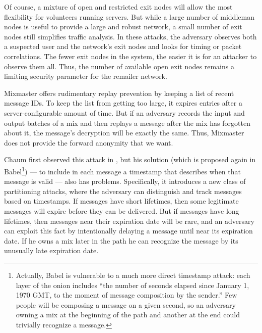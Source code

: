 \documentclass[times,10pt,twocolumn]{article}
\begin{document}

Of course, a mixture of open and restricted exit nodes will allow the
most flexibility for volunteers running servers. But while a large number
of middleman nodes is useful to provide a large and robust network, a
small number of exit nodes still simplifies traffic analysis.
In these attacks, the adversary observes both a suspected user and the
network's exit nodes and looks for timing or packet correlations.  The fewer
exit nodes in the system, the easier it is for an attacker to observe them
all.  Thus, the
number of available open exit nodes remains a limiting security parameter
for the remailer network.

\label{subsec:replay}

Mixmaster offers rudimentary replay prevention by keeping a list of recent
message IDs. To keep the list from getting too large, it expires entries
after a server-configurable amount of time. But if an adversary records
the input and output batches of a mix and then replays a message after
the mix has forgotten about it, the message's decryption will be exactly
the same. Thus, Mixmaster does not provide the forward anonymity that we want.

Chaum first observed this attack in \cite{chaum-mix},
but his solution (which is proposed again in Babel\footnote{
  Actually, Babel is vulnerable to a much more direct timestamp attack:
  each layer of the onion includes ``the number of seconds
  elapsed since January 1, 1970 GMT, to the moment of message composition
  by the sender.'' Few people will be composing a message on a given
  second, so an adversary owning a mix at the beginning of the path and
  another at the end could trivially recognize a message.
}) --- to include in each message a timestamp that describes when that message
is valid --- also has problems. Specifically, it introduces a new class
of partitioning attacks, where the adversary can distinguish and
track messages based on timestamps.  If messages have short lifetimes,
then some legitimate messages will expire before they can be
delivered. But if messages have long lifetimes, then messages near
their expiration date will be rare, and an adversary can exploit
this fact by intentionally delaying a message until near its expiration
date. If he owns a mix later in the path he can
recognize the message by its unusually late expiration date.
\end{document}
